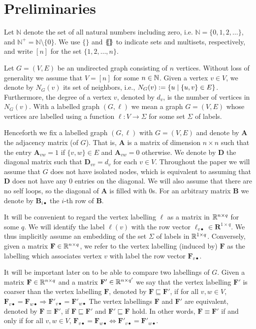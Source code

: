 \section{Preliminaries}
Let $\mathbb{N}$ denote the set of all natural numbers including zero, i.e.
$\mathbb{N} = \{0,1,2,\dots\}$, and $\mathbb{N}^+ = \mathbb{N} \setminus
\{0\}$.
We use $\{\!\}$ and $\{\!\!\{\! \}\!\!\}$ to indicate sets and multisets,
respectively, and write $[n]$ for the set $\{1,2,\ldots,n\}$.

Let $G=(V,E)$ be an undirected graph consisting of $n$ vertices. Without loss
of generality we assume that $V=[n]$ for some $n\in\mathbb{N}$. Given a vertex $v\in
V$, we denote by $N_G(v)$ its set of neighbors, i.e., $N_G(v):=\{u\mathrel{\mid}
\{u,v\}\in E\}$. Furthermore, the degree of a vertex $v$, denoted by $d_{v}$,
is the number of vertices in $N_G(v)$. With a labelled graph $(G,\pmb{\ell})$
we mean a graph $G=(V,E)$ whose vertices are labelled using a function
$\pmb{\ell}:V\to \Sigma$ for some set $\Sigma$ of labels. 

Henceforth we fix a labelled graph $(G,\pmb{\ell})$ with $G=(V,E)$ and denote
by $\mathbf{A}$ the adjacency matrix (of $G$). That is, $\mathbf{A}$ is a
matrix of dimension $n \times n$ such that the entry $\mathbf{A}_{vw}=1$ if
$\{v,w\}\in E$ and $\mathbf{A}_{vw}=0$ otherwise. We denote by $\mathbf{D}$
the diagonal matrix such that $\mathbf{D}_{vv}=d_v$ for each $v\in V$.
Throughout the paper we will assume that $G$ does not have isolated nodes,
which is equivalent to assuming that $\mathbf{D}$ does not have any $0$
entries on the diagonal. We will also assume that there are no self loops, so
the diagonal of $\mathbf{A}$ is filled with $0$s. For an arbitrary matrix
$\mathbf{B}$ we denote by $\mathbf{B}_{i\bullet}$ the $i$-th row of
$\mathbf{B}$.

It will be convenient to regard the vertex labelling $\pmb{\ell}$ as a matrix
in $\mathbb{R}^{n\times q}$ for some $q$. We will identify the label $\pmb{\ell}(v)$
with the row vector $\pmb{\ell}_{v\bullet}\in\mathbf{R}^{1\times q}$. We thus
implicitly assume an embedding of the set $\Sigma$ of labels in $\mathbb{R}^{1\times
q}$. Conversely, given a matrix $\mathbf{F} \in \mathbb{R}^{n \times q}$, we refer to
the vertex labelling (induced by) $\mathbf{F}$ as the labelling which
associates vertex $v$ with label the row vector $\mathbf{F}_{v\bullet}$.

It will be important later on to be able to compare two labellings of $G$.
Given a matrix $\mathbf{F} \in \mathbb{R}^{n\times q}$ and a matrix $\mathbf{F}' \in
\mathbb{R}^{n\times q'}$ we say that the vertex labelling  $\mathbf{F}'$ is coarser
than the vertex labelling $\mathbf{F}$, denoted by $\mathbf{F}\sqsubseteq
\mathbf{F}'$, if for all $v,w\in V$, $
\mathbf{F}_{v\bullet}=\mathbf{F}_{w\bullet} \Rightarrow
\mathbf{F}'_{v\bullet}=\mathbf{F}'_{w\bullet} $ The vertex labellings
$\mathbf{F}$ and $\mathbf{F}'$ are equivalent, denoted by
$\mathbf{F}\equiv\mathbf{F}'$, if $\mathbf{F}\sqsubseteq \mathbf{F}'$ and
$\mathbf{F}'\sqsubseteq \mathbf{F}$ hold. In other words,
$\mathbf{F}\equiv\mathbf{F}'$ if and only if for all $v,w\in V$, $
\mathbf{F}_{v\bullet}=\mathbf{F}_{w\bullet} \Leftrightarrow
\mathbf{F}'_{v\bullet}=\mathbf{F}'_{w\bullet} $.

